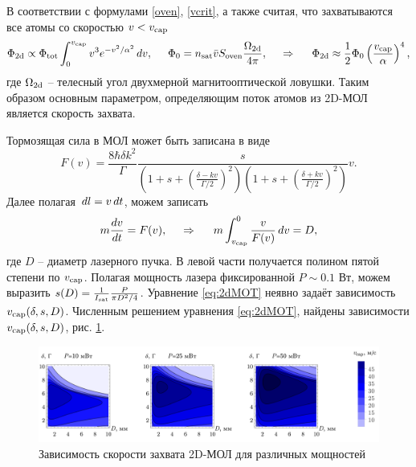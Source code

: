 

\startp
{}
В соответствии с формулами \eqref{oven}, \eqref{vcrit}, а также считая, что захватываются все атомы со скоростью $v < v_{\textnormal{cap}}$ \cite{hf}
\begin{equation}
	\Phi_{\textnormal{2d}} \propto \Phi_{\textnormal{tot}} \int_{0}^{v_{\textnormal{cap}}} v^3 e^{-v^2/\alpha^2} \, d v,
	\hspace{5 mm} 
	\Phi_0 = n_{\textnormal{sat}} \bar{v} S_{\textnormal{oven}} \frac{\Omega_{\textnormal{2d}}}{4 \pi},
	\hspace{0.5cm} \Rightarrow \hspace{0.5cm}
	\Phi_{\textnormal{2d}} \approx \frac{1}{2} \Phi_0 \left(\frac{v_{\textnormal{cap}}}{\alpha}\right)^4,
\end{equation}
где $\Omega_{\textnormal{2d}}$ -- телесный угол двухмерной магнитооптической ловушки. Таким образом основным параметром, определяющим поток атомов из 2D-МОЛ является скорость захвата. 


Тормозящая сила в МОЛ \cite[(3.1.5)]{vlad} может быть записана в виде
\begin{equation}
	F(v) = \frac{8 \hbar \delta k^2}{\Gamma} \frac{s}{\left(1+s+\left(\frac{\delta-kv}{\Gamma/2}\right)^2\right)\left(1+s+\left(\frac{\delta+kv}{\Gamma/2}\right)^2\right)}v.
	\label{eq:force2}
\end{equation}
Далее полагая $\, d l = v \, d t$, можем записать
\begin{equation}
	m \frac{dv}{dt} = F(v),
	\hspace{0.5cm} \Rightarrow \hspace{0.5cm}
	m \int_{v_{\textnormal{cap}}}^{0} \frac{v}{F(v)} \, d v = D,
	\label{eq:2dMOT}
\end{equation}
где $D$ -- диаметр лазерного пучка. В левой части получается полином пятой степени по $v_{\textnormal{cap}}$. Полагая мощность лазера фиксированной  $P \sim 0.1$ Вт, можем выразить $s(D) = \frac{1}{I_{\textnormal{sat}}}\frac{P}{\pi D^2/4}$.  Уравнение \eqref{eq:2dMOT} неявно задаёт зависимость $v_{\textnormal{cap}}(\delta, s, D)$. Численным решением уравнения \eqref{eq:2dMOT}, найдены зависимости $v_{\textnormal{cap}}(\delta, s, D)$, рис. \ref{fig:vcapDs}.


\begin{figure}[ht]
    \centering
    \includegraphics[width=1.0\textwidth]{figs/vcap2d_delta-Ds.png}
    \caption{Зависимость скорости захвата 2D-МОЛ для различных мощностей}
    \label{fig:vcapDs}
\end{figure}

